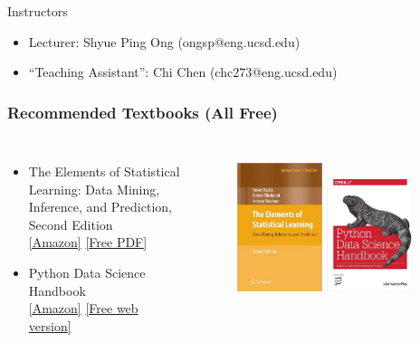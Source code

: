 \documentclass[aspectratio=169]{beamer}
\begin{document}
\begin{frame}{Instructors}
    \begin{itemize}
        \item Lecturer: Shyue Ping Ong (ongsp@eng.ucsd.edu)
        \item ``Teaching Assistant'': Chi Chen (chc273@eng.ucsd.edu)
    \end{itemize}
\end{frame}


\begin{frame}
\frametitle{Recommended Textbooks (All Free)}
\begin{columns}
    \begin{itemize}
        \item The Elements of Statistical Learning: Data Mining, Inference, and Prediction, Second Edition\\ \href{http://www.amazon.com/dp/0387848576/ref=cm_sw_em_r_mt_dp_U_LTvbEbPHKK8VF}{[Amazon]} \href{http://web.stanford.edu/~hastie/ElemStatLearn/}{[Free PDF]}
        \item Python Data Science Handbook\\
        \href{https://www.amazon.com/dp/1491912057/ref=cm_sw_em_r_mt_dp_U_g0vbEb9N7HVQD}{[Amazon]} \href{http://jakevdp.github.io/PythonDataScienceHandbook/}{[Free web version]}
    \end{itemize}
\begin{figure}
    \centering
    \includegraphics[width=0.45\textwidth]{figures/book-cover-elements-of-statistical-learning.jpg}
    \includegraphics[width=0.45\textwidth]{figures/book-cover-python-data-science.jpg}

\end{figure}
\end{columns}
\end{frame}
\end{document}
